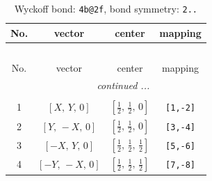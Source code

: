 \documentclass[fleqn,8pt]{jsarticle}
\begin{document}
\renewcommand{\arraystretch}{1.2}
\begin{longtable}{cccc}
\caption{Wyckoff bond: {\tt 4b@2f}, bond symmetry: {\tt 2..}}
 \\
 \hline \hline
No. & vector & center & mapping \\ \hline \endfirsthead

\multicolumn{3}{l}{\tablename\ \thetable{}} \\
 \hline \hline
No. & vector & center & mapping \\ \hline \endhead

 \hline \hline
\multicolumn{3}{r}{\footnotesize\it continued ...} \\ \endfoot

 \hline \hline
\multicolumn{3}{r}{} \\ \endlastfoot

1 & $\left[ X,\, Y,\, 0 \right]$ & $\left[ \frac{1}{2},\, \frac{1}{2},\, 0 \right]$ & {\tt [1,-2]} \\ \hline
2 & $\left[ Y,\, - X,\, 0 \right]$ & $\left[ \frac{1}{2},\, \frac{1}{2},\, 0 \right]$ & {\tt [3,-4]} \\ \hline
3 & $\left[ - X,\, Y,\, 0 \right]$ & $\left[ \frac{1}{2},\, \frac{1}{2},\, \frac{1}{2} \right]$ & {\tt [5,-6]} \\ \hline
4 & $\left[ - Y,\, - X,\, 0 \right]$ & $\left[ \frac{1}{2},\, \frac{1}{2},\, \frac{1}{2} \right]$ & {\tt [7,-8]} \\
\end{longtable}
\renewcommand{\arraystretch}{1.2}
\end{document}
